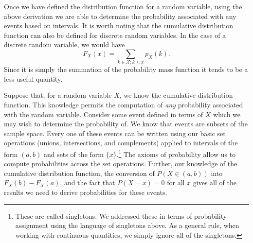 \documentclass[
  letterpaper,
  DIV=11,
  numbers=noendperiod]{scrreprt}
\theoremstyle{definition}
\theoremstyle{definition}
\theoremstyle{definition}
\theoremstyle{remark}
\begin{document}
Once we have defined the distribution function for a random variable,
using the above derivation we are able to determine the probability
associated with any events based on intervals. It is worth noting that
the cumulative distribution function can also be defined for discrete
random variables. In the case of a discrete random variable, we would
have \[F_X(x) = \sum_{k \in\mathcal{X}; k \leq x} p_X(k).\] Since it is
simply the summation of the probability mass function it tends to be a
less useful quantity.

Suppose that, for a random variable \(X\), we know the cumulative
distribution function. This knowledge permits the computation of
\emph{any} probability associated with the random variable. Consider
some event defined in terms of \(X\) which we may wish to determine the
probability of. We know that events are subsets of the sample space.
Every one of these events can be written using our basic set operations
(unions, intersections, and complements) applied to intervals of the
form \((a,b)\) and sets of the form \(\{x\}\).\footnote{These are called
  singletons. We addressed these in terms of probability assignment
  using the language of singletons above. As a general rule, when
  working with continuous quantities, we simply ignore all of the
  singletons.} The axioms of probability allow us to compute
probabilities across the set operations. Further, our knowledge of the
cumulative distribution function, the conversion of \(P(X \in (a,b))\)
into \(F_X(b) - F_X(a)\), and the fact that \(P(X=x) = 0\) for all \(x\)
gives all of the results we need to derive probabilities for these
events.
\end{document}
